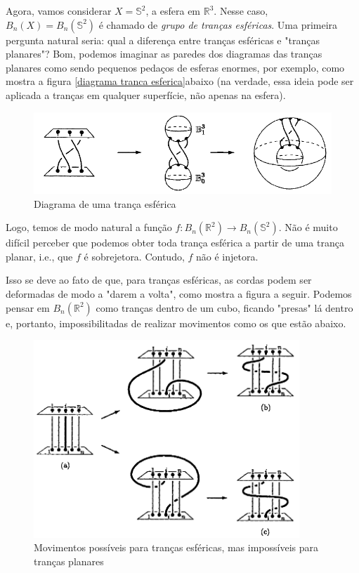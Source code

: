 \documentclass[a4paper,portuguese,11pt,twoside, leqno]{book}
\theoremstyle{definition}
\begin{document}
	\par\vspace{0.3cm} Agora, vamos considerar $X = \mathbb{S}^2$, a esfera em $\mathbb{R}^3$. Nesse caso, $B_n(X) = B_n(\mathbb{S}^2)$ é chamado de \textit{grupo de tranças esféricas}. Uma primeira pergunta natural seria: qual a diferença entre tranças esféricas e "tranças planares"? Bom, podemos imaginar as paredes dos diagramas das tranças planares como sendo pequenos pedaços de esferas enormes, por exemplo, como mostra a figura \eqref{diagrama tranca esferica}abaixo (na verdade, essa ideia pode ser aplicada a tranças em qualquer superfície, não apenas na esfera).
	
	\begin{figure}[H]
		\begin{center}
			\includegraphics[width=12cm]{diagrama_tranca_esferica.png}
		\end{center}\caption{Diagrama de uma trança esférica}
		\label{diagrama tranca esferica}
	\end{figure}
	\par\vspace{0.3cm} Logo, temos de modo natural a função $f: B_n(\mathbb{R}^2)\to B_n(\mathbb{S}^2)$. Não é muito difícil perceber que podemos obter toda trança esférica a partir de uma trança planar, i.e., que $f$ é sobrejetora. Contudo, $f$ não é injetora.
	\par\vspace{0.3cm} Isso se deve ao fato de que, para tranças esféricas, as cordas podem ser deformadas de modo a "darem a volta", como mostra a figura a seguir. Podemos pensar em $B_n(\mathbb{R}^2)$ como tranças dentro de um cubo, ficando "presas" lá dentro e, portanto, impossibilitadas de realizar movimentos como os que estão abaixo.
	
	\begin{figure}[H]
		\begin{center}
			\includegraphics[width=10cm]{movimentos_trancas_esfericas.png}
		\end{center}\caption{Movimentos possíveis para tranças esféricas, mas impossíveis para tranças planares}
		\label{movimentos trancas esfericas}
	\end{figure} 
	
\end{document}
